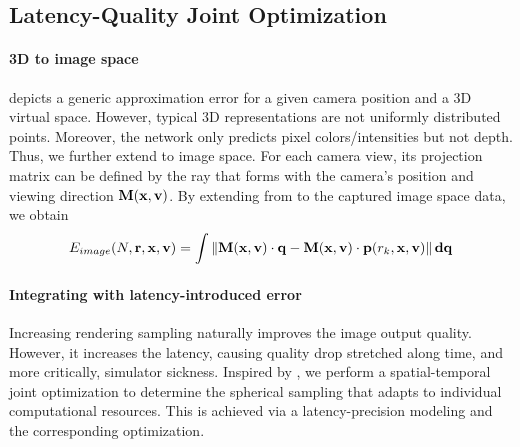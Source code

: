 \subsection{Latency-Quality Joint Optimization}
\label{sec:method:optimization}
\paragraph{3D to image space}
 depicts a generic approximation error for a given camera position and a 3D virtual space. However, typical 3D representations are not uniformly distributed points. Moreover, the network only predicts pixel colors/intensities but not depth. Thus, we further extend  to image space.
For each camera view, its projection matrix can be defined by the ray that forms with the camera's position and viewing direction $\mathbf{M}(\mathbf{x},\mathbf{v})$. By extending from  to the captured image space data, we obtain
\begin{align}
E_{image}(N, \mathbf{r}, \mathbf{x}, \mathbf{v})  = \int \left\lVert\mathbf{M}(\mathbf{x},\mathbf{v})\cdot\mathbf{q}-\mathbf{M}(\mathbf{x},\mathbf{v})\cdot
\mathbf{p}(r_k,\mathbf{x},\mathbf{v})\right\rVert\mathbf{d}\mathbf{q} 
\label{eq:imageError}
\end{align}

\paragraph{Integrating with latency-introduced error}
Increasing rendering sampling naturally improves the image output quality. However, it increases the latency, causing quality drop stretched along time, and more critically, simulator sickness.
Inspired by \cite{Li:2020:TSP,albert2017latency}, we perform a spatial-temporal joint optimization to determine the spherical sampling that adapts to individual computational resources. This is achieved via a latency-precision modeling and the corresponding optimization. 

